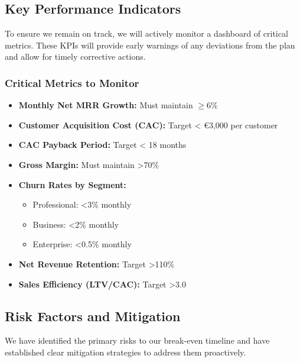 \documentclass[11pt, a4paper, oneside]{article}
\begin{document}
\subsection{Key Performance Indicators}
To ensure we remain on track, we will actively monitor a dashboard of critical metrics. These KPIs will provide early warnings of any deviations from the plan and allow for timely corrective actions.

\subsubsection{Critical Metrics to Monitor}
\begin{itemize}
    \item \textbf{Monthly Net MRR Growth:} Must maintain $\geq$6\% 
    \item \textbf{Customer Acquisition Cost (CAC):} Target < \euro{3,000} per customer
    \item \textbf{CAC Payback Period:} Target < 18 months
    \item \textbf{Gross Margin:} Must maintain >70\%
    \item \textbf{Churn Rates by Segment:}
    \begin{itemize}
        \item Professional: <3\% monthly
        \item Business: <2\% monthly
        \item Enterprise: <0.5\% monthly
    \end{itemize}
    \item \textbf{Net Revenue Retention:} Target >110\%
    \item \textbf{Sales Efficiency (LTV/CAC):} Target >3.0
\end{itemize}

\subsection{Risk Factors and Mitigation}
We have identified the primary risks to our break-even timeline and have established clear mitigation strategies to address them proactively.
\end{document}
